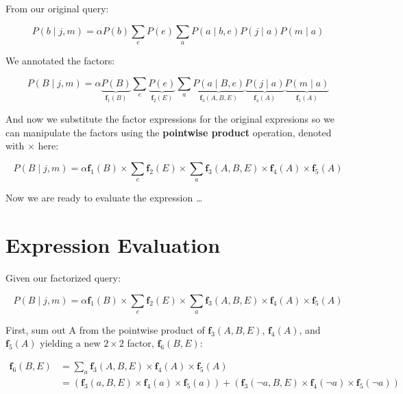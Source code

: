 \documentclass[smaller]{article}
\begin{document}
From our original query:

\begin{equation}
P(b \mid j, m) = \alpha P(b) \sum_e P(e) \sum_a P(a \mid b, e) P(j \mid a) P(m \mid a) \tag{13.5}
\end{equation}

We annotated the factors:


\begin{equation}
P(B \mid j, m) =
\alpha \underbrace{P(B)}_{\bm{f}_1(B)}
\sum_e
\underbrace{P(e)}_{\bm{f}_2(E)}
\sum_a
\underbrace{P(a \mid B, e)}_{\bm{f}_3(A,B,E)}
\underbrace{P(j \mid a)}_{\bm{f}_4(A)}
\underbrace{P(m \mid a)}_{\bm{f}_5(A)}
\end{equation}

And now we substitute the factor expressions for the original expresions so we can manipulate the factors using the \textbf{pointwise product} operation, denoted with \(\times\) here:

\begin{equation}
P(B \mid j, m) =
\alpha \bm{f}_1(B) \times \sum_e \bm{f}_2(E) \times \sum_a \bm{f}_3(A,B,E) \times \bm{f}_4(A) \times \bm{f}_5(A)
\end{equation}

Now we are ready to evaluate the expression \ldots{}
\section{Expression Evaluation}
\label{sec:org6df348a}

Given our factorized query:


\vspace{-.1in}
\begin{equation}
P(B \mid j, m) =
\alpha \bm{f}_1(B) \times \sum_e \bm{f}_2(E) \times \sum_a \bm{f}_3(A,B,E) \times \bm{f}_4(A) \times \bm{f}_5(A)
\end{equation}


First, sum out A from the pointwise product of \(\bm{f}_3(A,B,E)\), \(\bm{f}_4(A)\), and \(\bm{f}_5(A)\) yielding a new \(2 \times 2\) factor, \(\bm{f}_6(B,E)\):


\vspace{-.2in}
\begin{align*}
\bm{f}_6(B,E) &= \sum_a \bm{f}_3(A,B,E) \times \bm{f}_4(A) \times \bm{f}_5(A) \\
              &= (\bm{f}_3(a,B,E) \times \bm{f}_4(a) \times \bm{f}_5(a)) + (\bm{f}_3(\neg a,B,E) \times \bm{f}_4(\neg a) \times \bm{f}_5(\neg a))
\end{align*}
\vspace{-.2in}
\end{document}
